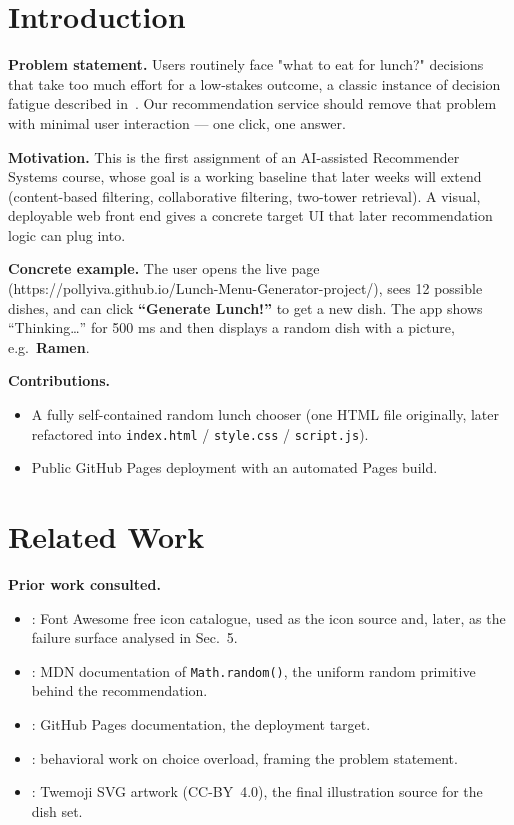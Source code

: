 \documentclass[11pt,a4paper]{article}
\begin{document}
\section{Introduction}

\textbf{Problem statement.} Users routinely face "what to eat for lunch?" decisions that take too much effort for a low-stakes outcome, a
classic instance of decision fatigue described in~\cite{schwartz2004paradox}. Our recommendation service should remove that problem with minimal user interaction --- one
click, one answer.

\textbf{Motivation.} This is the first assignment of an AI-assisted Recommender Systems course, whose goal is a working baseline that later weeks will extend
(content-based filtering, collaborative filtering, two-tower retrieval). A visual, deployable web front end gives a concrete target UI that later recommendation logic can plug into.

\textbf{Concrete example.} The user opens the live page (https://pollyiva.github.io/Lunch-Menu-Generator-project/), sees 12 possible dishes, and can click \textbf{``Generate Lunch!''} to get a new dish. The app shows ``Thinking\ldots'' for 500 ms and then displays a random dish with a picture, e.g.\ \textbf{Ramen}.

\textbf{Contributions.}
\begin{itemize}[leftmargin=2em,itemsep=1pt]
  \item A fully self-contained random lunch chooser (one HTML file originally, later
        refactored into \texttt{index.html} / \texttt{style.css} / \texttt{script.js}).
  \item Public GitHub Pages deployment with an automated Pages build.
          
\end{itemize}

\section{Related Work}

\textbf{Prior work consulted.}
\begin{itemize}[leftmargin=2em,itemsep=1pt]
  \item \cite{fontawesome}: Font Awesome free icon catalogue, used as the icon source and,
        later, as the failure surface analysed in Sec.~5.
  \item \cite{mdnrandom}: MDN documentation of \texttt{Math.random()}, the uniform random
        primitive behind the recommendation.
  \item \cite{ghpages}: GitHub Pages documentation, the deployment target.
  \item \cite{schwartz2004paradox}: behavioral work on choice overload, framing the problem
        statement.
  \item \cite{twemoji}: Twemoji SVG artwork (CC-BY~4.0), the final illustration source for
        the dish set.
\end{itemize}
\end{document}
